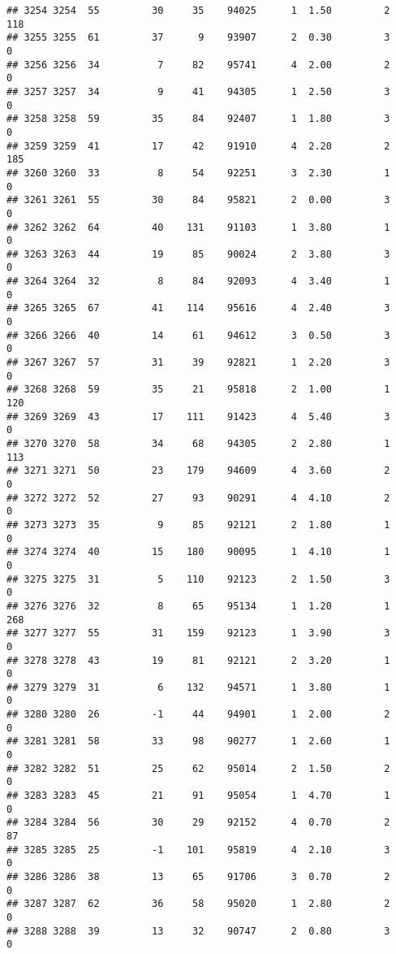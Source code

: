 \documentclass[
]{article}
\begin{document}
\begin{verbatim}
## 3254 3254  55         30     35    94025      1  1.50         2      118
## 3255 3255  61         37      9    93907      2  0.30         3        0
## 3256 3256  34          7     82    95741      4  2.00         2        0
## 3257 3257  34          9     41    94305      1  2.50         3        0
## 3258 3258  59         35     84    92407      1  1.80         3        0
## 3259 3259  41         17     42    91910      4  2.20         2      185
## 3260 3260  33          8     54    92251      3  2.30         1        0
## 3261 3261  55         30     84    95821      2  0.00         3        0
## 3262 3262  64         40    131    91103      1  3.80         1        0
## 3263 3263  44         19     85    90024      2  3.80         3        0
## 3264 3264  32          8     84    92093      4  3.40         1        0
## 3265 3265  67         41    114    95616      4  2.40         3        0
## 3266 3266  40         14     61    94612      3  0.50         3        0
## 3267 3267  57         31     39    92821      1  2.20         3        0
## 3268 3268  59         35     21    95818      2  1.00         1      120
## 3269 3269  43         17    111    91423      4  5.40         3        0
## 3270 3270  58         34     68    94305      2  2.80         1      113
## 3271 3271  50         23    179    94609      4  3.60         2        0
## 3272 3272  52         27     93    90291      4  4.10         2        0
## 3273 3273  35          9     85    92121      2  1.80         1        0
## 3274 3274  40         15    180    90095      1  4.10         1        0
## 3275 3275  31          5    110    92123      2  1.50         3        0
## 3276 3276  32          8     65    95134      1  1.20         1      268
## 3277 3277  55         31    159    92123      1  3.90         3        0
## 3278 3278  43         19     81    92121      2  3.20         1        0
## 3279 3279  31          6    132    94571      1  3.80         1        0
## 3280 3280  26         -1     44    94901      1  2.00         2        0
## 3281 3281  58         33     98    90277      1  2.60         1        0
## 3282 3282  51         25     62    95014      2  1.50         2        0
## 3283 3283  45         21     91    95054      1  4.70         1        0
## 3284 3284  56         30     29    92152      4  0.70         2       87
## 3285 3285  25         -1    101    95819      4  2.10         3        0
## 3286 3286  38         13     65    91706      3  0.70         2        0
## 3287 3287  62         36     58    95020      1  2.80         2        0
## 3288 3288  39         13     32    90747      2  0.80         3        0

\end{verbatim}
\end{document}

